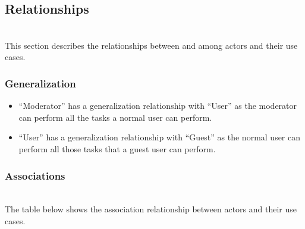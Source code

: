 \subsection{Relationships}\label{ZLLCJL3zC0JhX2cfP-5x8}
\\
This section describes the relationships between and among actors and their use cases.

\subsubsection{Generalization}\label{KxP_kk2X6_r43zzvw7gjQ}

\begin{itemize}
\item
\protect{}\label{1Tz-fI0zxJrElpolMV5nT}
``Moderator'' has a generalization relationship with ``User'' as the moderator can perform all the tasks a normal user can perform.
\item
\protect{}\label{UIbDjBkPHmctUJH495qtX}
``User'' has a generalization relationship with ``Guest'' as the normal user can perform all those tasks that a guest user can perform.
\end{itemize}

\subsubsection{Associations}\label{sC7xa3eLcACG2l7_CgVN7}
\\
The table below shows the association relationship between actors and their use cases.

